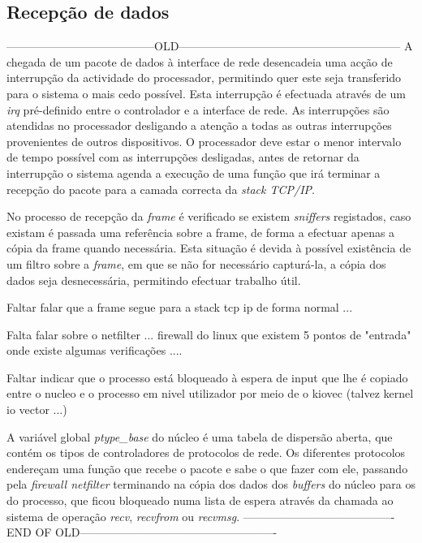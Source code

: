 \subsection{Recepção de dados}
---------------------------------------OLD-----------------------------------------------------------
A chegada de um pacote de dados à interface de rede desencadeia uma acção de interrupção da actividade do processador, permitindo quer este seja transferido para o sistema o mais cedo possível.
Esta interrupção é efectuada através de um \textit{irq} pré-definido entre o controlador e a interface de rede. As interrupções são atendidas no processador desligando a atenção a todas as outras interrupções provenientes de outros dispositivos. %
O processador deve estar o menor intervalo de tempo possível com as interrupções desligadas, antes de retornar da interrupção o sistema agenda a execução de uma função que irá terminar a recepção do pacote para a camada correcta da \textit{stack TCP/IP}.%

No processo de recepção da \textit{frame} é verificado se existem \textit{sniffers} registados, caso existam é passada uma referência sobre a frame, de forma a efectuar apenas a cópia da frame quando necessária.
Esta situação é devida à possível existência de um filtro sobre a \textit{frame}, em que se não for necessário capturá-la, a cópia dos dados seja desnecessária, permitindo efectuar trabalho útil.

Faltar falar que a frame segue para a stack tcp ip de forma normal ...

Falta falar sobre o netfilter ... firewall do linux que existem 5 pontos de "entrada" onde existe algumas verificações .... 

Faltar indicar que o processo está bloqueado à espera de input que lhe é copiado entre o nucleo e o processo em nivel utilizador por meio de o kiovec (talvez kernel io vector ...) 


A variável global \textit{ptype\_base} do núcleo é uma tabela de dispersão aberta, que contém os tipos de controladores de protocolos de rede. Os diferentes protocolos endereçam uma função que recebe o pacote e sabe o que fazer com ele, passando pela \textit{firewall netfilter} terminando na cópia dos dados dos \textit{buffers} do núcleo para os do processo, que ficou bloqueado numa lista de espera através da chamada ao sistema de operação \textit{recv}, \textit{recvfrom} ou \textit{recvmsg}.
----------------------------------------END OF OLD----------------------------------------------------

